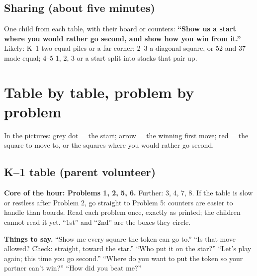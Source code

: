\documentclass[10pt]{article}
\newcommand{\gbox}[1]{\par\smallskip\noindent\colorbox{boxbg}{\parbox{\dimexpr\textwidth-2\fboxsep\relax}{#1}}\par\smallskip}
\begin{document}
\subsection{Sharing (about five minutes)}
One child from each table, with their board or counters: \textbf{``Show us a start where you would rather go second, and show how you win from it.''} Likely: K--1 two equal piles or a far corner; 2--3 a diagonal square, or 52 and 37 made equal; 4--5 1, 2, 3 or a start split into stacks that pair up.

\section{Table by table, problem by problem}
In the pictures: grey dot = the start; arrow = the winning first move; red = the square to move to, or the squares where you would rather go second.

\subsection{K--1 table (parent volunteer)}\label{k1}
\textbf{Core of the hour: Problems 1, 2, 5, 6.} Further: 3, 4, 7, 8. If the table is slow or restless after Problem 2, go straight to Problem 5: counters are easier to handle than boards. Read each problem once, exactly as printed; the children cannot read it yet. ``1st'' and ``2nd'' are the boxes they circle.

\gbox{\textbf{Things to say.} ``Show me every square the token can go to.'' \;``Is that move allowed? Check: straight, toward the star.'' \;``Who put it on the star?'' \;``Let's play again; this time you go second.'' \;``Where do you want to put the token so your partner can't win?'' \;``How did you beat me?''}
\end{document}
